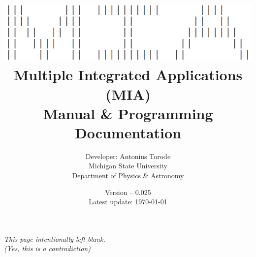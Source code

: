 \documentclass[openany,a4paper,11pt]{book}
\title{\vspace{0.1cm}  \includegraphics[scale=0.5]{./Images/MIA_cropped_Inverted.png} \vspace{.5cm} \\ Multiple Integrated Applications (MIA) \\  Manual \& Programming Documentation}
\author{Developer: Antonius Torode \\ Michigan State University \\ Department of Physics \& Astronomy}
\date{Version -- 0.025 \\ Latest update: \today}
\begin{document}
\frontmatter
\maketitle

\tableofcontents
\newpage
\vspace*{\fill}
\begin{center}
	\textit{This page intentionally left blank. \\(Yes, this is a contradiction)}
\end{center}
\vspace*{\fill}

\mainmatter
\pagestyle{fancy}
\fancyhf{}
\fancyhead[RO, LE]{\thepage}






%


\backmatter


\end{document}
